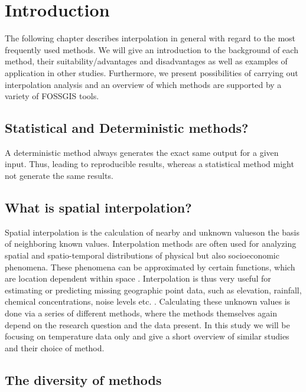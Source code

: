 
\section{Introduction}

The following chapter describes interpolation in general with regard to the most frequently used methods. We will give an introduction to the background of each method, their suitability/advantages and disadvantages as well as examples of application in other studies. Furthermore, we present possibilities of carrying out interpolation analysis and an overview of which methods are supported by a variety of FOSSGIS tools.


\subsection{Statistical and Deterministic methods?}

A deterministic method always generates the exact same output for a given input. Thus, leading to reproducible results, whereas a statistical method might not generate the same results.

\subsection{What is spatial interpolation?}

Spatial interpolation is the calculation of nearby and unknown values ​​on the basis of neighboring known values. \cite{gitta_raumliche_2016} Interpolation methods are often used for analyzing spatial and spatio-temporal distributions of physical but also socioeconomic phenomena. These phenomena can be approximated by certain functions, which are location dependent within space \cite{mitas_spatial_1999}. Interpolation is thus very useful for estimating or predicting missing geographic point data, such as elevation, rainfall, chemical concentrations, noise levels etc. \cite{samanta_interpolation_2012}. Calculating these unknown values is done via a series of different methods, where the methods themselves again depend on the research question and the data present. In this study we will be focusing on temperature data only and give a short overview of similar studies and their choice of method.

\subsection{The diversity of methods}


